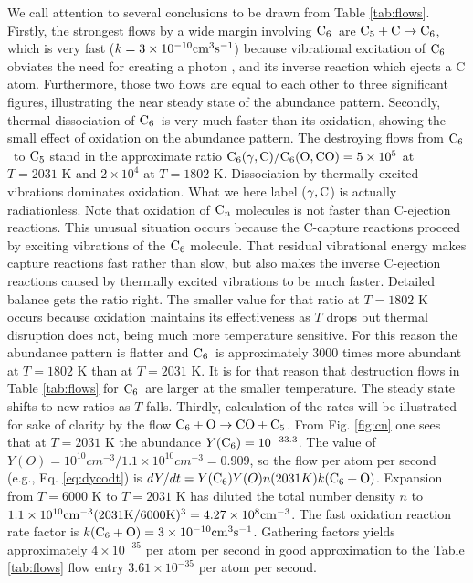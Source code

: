 \documentclass[manuscript]{aastex}
\newcommand{\cfive}{{\rm C}_5}
\newcommand{\csix}{{\rm C}_6}
\newcommand{\cenn}{{\rm C}_n}
\newcommand{\cfivectocsix}{$\cfive + {\rm C} \to \csix$}
\newcommand{\csixotococfive}{${\rm C}_6 + {\rm O} \to {\rm CO} + {\rm C_5}$}
\begin{document}
We call attention to several conclusions to be drawn from Table \ref{tab:flows}.
Firstly, the strongest flows by a wide margin involving $\csix$\ are
\cfivectocsix,
which is very fast ($k = 3 \times 10^{-10} {\rm cm}^3 {\rm s}^{-1}$)
because vibrational excitation of $\csix$
obviates the need for creating a photon \citep{1999Sci...283.1290C},
and its inverse reaction which ejects a C atom. Furthermore, those two flows
are equal to each other to three significant figures, illustrating the near 
steady
state of the abundance pattern. Secondly, thermal dissociation of $\csix$\ is
very much faster than its oxidation, showing the small effect of oxidation
on the abundance pattern. The destroying flows from $\csix$\ to $\cfive$
stand in the approximate ratio
${\rm C}_6(\gamma,{\rm C})/{\rm C_6}({\rm O},{\rm CO}) = 5 \times 10^5$
at $T = 2031$ K and $2 \times 10^4$ at $T = 1802$ K.
Dissociation by thermally excited vibrations dominates oxidation. What we here
label ($\gamma,{\rm C}$) is actually radiationless. Note that oxidation of
$\cenn$ molecules is not faster than C-ejection reactions. This unusual
situation occurs because the C-capture reactions proceed by exciting 
vibrations of the $\csix$ molecule. That residual vibrational energy makes
capture reactions fast rather than slow, but also makes the inverse C-ejection
reactions caused by thermally excited vibrations to be much faster. Detailed
balance gets the ratio right. The smaller value for that ratio at $T=1802$ K
occurs because oxidation maintains its effectiveness as $T$ drops but
thermal disruption does not, being much more temperature sensitive.
For this reason the abundance pattern is flatter and $\csix$\ is approximately
3000 times more abundant at $T=1802$ K than at $T=2031$ K.
It is for that reason that destruction flows in Table \ref{tab:flows}
for $\csix$\ are
larger at the smaller temperature.
The steady state shifts to new ratios as $T$ falls.
Thirdly, calculation of the rates will be illustrated for sake of clarity
by the flow
\csixotococfive.
From Fig. \ref{fig:cn}
one sees that at $T = 2031$ K the abundance $Y(\csix) = 10^{-33.3}$.
The value of $Y(O) = 10^{10} cm^{-3} / 1.1 \times 10^{10} cm^{-3} = 0.909$,
so the flow per atom per
second (e.g., Eq. \ref{eq:dycodt}) is
$dY/dt= Y(\csix)Y(O)n(2031K)k(\csix + {\rm O})$.
Expansion from $T=6000$ K to $T=2031$ K has diluted the total number
density $n$ to $1.1 \times 10^{10}{\rm cm}^{-3}
(2031 {\rm K}/6000 {\rm K})^3 = 4.27 \times 10^8{\rm cm}^{-3}$.
The fast oxidation reaction rate factor is
$k(\csix + {\rm O}) = 3 \times 10^{-10} {\rm cm}^3{\rm s}^{-1}$.
Gathering factors yields approximately $4 \times 10^{-35}$ per atom
per second
in good approximation to the Table \ref{tab:flows}
flow entry $3.61 \times 10^{-35}$ per atom per second.
\end{document}
